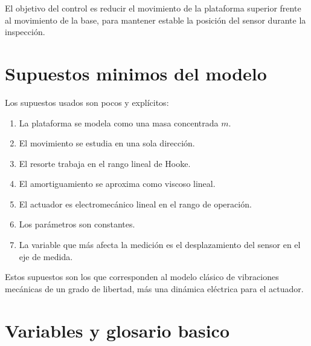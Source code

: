 \documentclass[11pt]{article}
\begin{document}
El objetivo del control es reducir el movimiento de la plataforma superior frente al movimiento de la base, para mantener estable la posici\'on del sensor durante la inspecci\'on.

\section{Supuestos minimos del modelo}

Los supuestos usados son pocos y expl\'icitos:

\begin{enumerate}[leftmargin=1.2cm]
\item La plataforma se modela como una masa concentrada $m$.
\item El movimiento se estudia en una sola direcci\'on.
\item El resorte trabaja en el rango lineal de Hooke.
\item El amortiguamiento se aproxima como viscoso lineal.
\item El actuador es electromec\'anico lineal en el rango de operaci\'on.
\item Los par\'ametros son constantes.
\item La variable que m\'as afecta la medici\'on es el desplazamiento del sensor en el eje de medida.
\end{enumerate}

Estos supuestos son los que corresponden al modelo cl\'asico de vibraciones mec\'anicas de un grado de libertad, m\'as una din\'amica el\'ectrica para el actuador.

\section{Variables y glosario basico}
\end{document}
